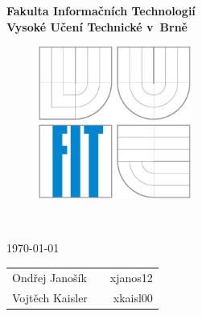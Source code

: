 \begin{titlepage}

\begin{center}
  \begin{large}
    \bf{Fakulta Informačních Technologií} \\
    \vspace*{0.5cm}
    \bf{Vysoké Učení Technické v~Brně}
  \end{large}
\end{center}

\vfill

\begin{figure}[!h]
  \centering
  \includegraphics[height=5cm]{img/logo.eps}
\end{figure}

\vfill

\begin{center}
  \bigskip
  \begin{Huge}
    \bf{\projname}\\
  \end{Huge}

  \vspace*{1cm}

  \begin{Large}
    \bf{\projsubname}
  \end{Large}

  \vspace*{0.75cm}

  \begin{Large}
    \today
  \end{Large}
\end{center}

\vfill

\begin{large}
    \begin{tabularx}{\textwidth}{lXr}
      Ondřej Janošík & & xjanos12 \hspace{1.25cm} \\
      Vojtěch Kaisler & & xkaisl00 \hspace{1.25cm} \\
    \end{tabularx}
\end{large}

\end{titlepage}
